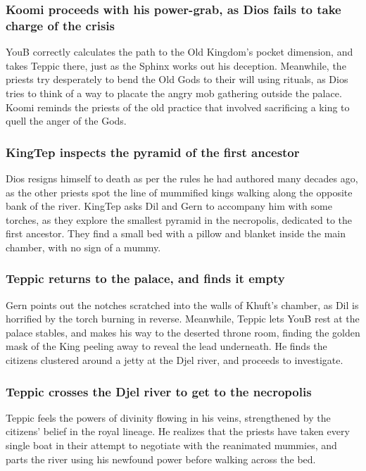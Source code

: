 \subsubsection{\Gls{Koomi} proceeds with his power-grab, as \Gls{Dios} fails to take charge of the
    crisis}
\Gls{YouB} correctly calculates the path to the Old Kingdom's pocket dimension, and takes
\Gls{Teppic} there, just as the \Gls{Sphinx} works out his deception. Meanwhile, the priests try
desperately to bend the Old Gods to their will using rituals, as \Gls{Dios} tries to think of a way
to placate the angry mob gathering outside the palace. \Gls{Koomi} reminds the priests of the old
practice that involved sacrificing a king to quell the anger of the Gods.

\subsubsection{\Gls{KingTep} inspects the pyramid of the first ancestor}
\Gls{Dios} resigns himself to death as per the rules he had authored many decades ago, as the other
priests spot the line of mummified kings walking along the opposite bank of the river. \Gls{KingTep}
asks \Gls{Dil} and \Gls{Gern} to accompany him with some torches, as they explore the smallest
pyramid in the necropolis, dedicated to the first ancestor. They find a small bed with a pillow
and blanket inside the main chamber, with no sign of a mummy.

\subsubsection{\Gls{Teppic} returns to the palace, and finds it empty}
\Gls{Gern} points out the notches scratched into the walls of \Gls{Khuft}'s chamber, as \Gls{Dil}
is horrified by the torch burning in reverse. Meanwhile, \Gls{Teppic} lets \Gls{YouB} rest at the
palace stables, and makes his way to the deserted throne room, finding the golden mask of the King
peeling away to reveal the lead underneath. He finds the citizens clustered around a jetty at the
Djel river, and proceeds to investigate.

\subsubsection{\Gls{Teppic} crosses the Djel river to get to the necropolis}
\Gls{Teppic} feels the powers of divinity flowing in his veins, strengthened by the citizens'
belief in the royal lineage. He realizes that the priests have taken every single boat in their
attempt to negotiate with the reanimated mummies, and parts the river using his newfound power
before walking across the bed.

